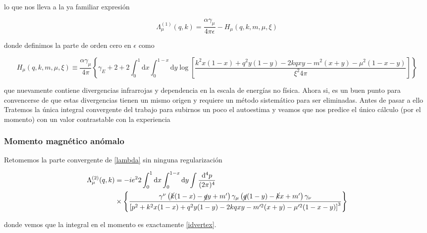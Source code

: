 \documentclass[tickz]{article}
\numberwithin{equation}{section}
\begin{document}
lo que nos lleva a la ya familiar expresión

\begin{boxquation}
\begin{equation}\label{vertexregular}
\Lambda^{(1)}_{\mu}(q,k)=\frac{\alpha \gamma_{\mu}}{4\pi \epsilon} - H_{\mu}(q,k,m,\mu,\xi)
\end{equation}
\end{boxquation}

donde definimos la parte de orden cero en $ \epsilon $ como

\begin{equation}\label{key}
H_{\mu}(q,k,m,\mu,\xi) \equiv \frac{\alpha \gamma_{\mu}}{4\pi} \left\{ \gamma_E + 2 + 2\int_0^1\mathrm{d}x\int_0^{1-x}\mathrm{d}y \log\left[\frac{k^2x(1-x) +q^2y(1-y) -2kqxy -m^2(x+y) -\mu^2(1-x-y)}{\xi^2 4\pi}\right] \right\}
\end{equation}

que nuevamente contiene divergencias infrarrojas y dependencia en la escala de energías no física. Ahora si, es un buen punto para convencerse de que estas divergencias tienen un mismo origen y requiere un método sistemático para ser eliminadas. Antes de pasar a ello Tratemos la única integral convergente del trabajo para subirnos un poco el autoestima y veamos que nos predice el único cálculo (por el momento) con un valor contrastable con la experiencia\\

\subsubsection{Momento magnético anómalo}

Retomemos la parte convergente de \ref{lambda} sin ninguna regularización

\begin{equation}\label{key}
\begin{aligned}
\Lambda^{(2)}_{\mu}(q,k)&=-ie^22\int_0^1\mathrm{d}x\int_0^{1-x}\mathrm{d}y \int \frac{\mathrm{d^4}p}{(2\pi)^4}\\
& \times \left\{ \frac{  \gamma^{\nu}\left(\cancel{k}(1-x) -\cancel{q}y+m'\right)\gamma_{\mu}\left( \cancel{q}(1-y) -\cancel{k}x +m'\right)\gamma_{\nu}}{\left[p^2 + k^2x(1-x) +q^2y(1-y) -2kqxy -m'^2(x+y) -\mu'^2(1-x-y)\right]^3} \right\}
\end{aligned}
\end{equation}

donde vemos que la integral en el momento es exactamente \ref{idvertex}.
\end{document}
